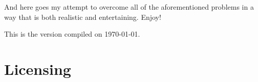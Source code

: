 And here goes my attempt to overcome all of the aforementioned problems in a way that is both realistic and entertaining. Enjoy!

This is the version compiled on \today.

\section*{Licensing}

\doclicenseThis

\hspace*{\fill} \qrcode[nolink,level=L,height=3cm]{\doclicenseURL}